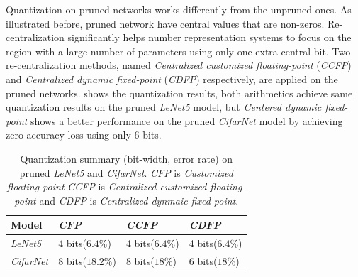 \documentclass[a4paper,12pt]{report}
\begin{document}
Quantization on pruned networks works differently from the unpruned ones.
As illustrated before, pruned network have central values that are non-zeros.
Re-centralization significantly helps number representation systems to focus
on the region with a large number of parameters using only one extra central bit.
Two re-centralization methods, named \textit{Centralized customized floating-point}
(\textit{CCFP}) and \textit{Centralized dynamic fixed-point} (\textit{CDFP}) respectively, are
applied on the pruned networks.
 shows the quantization results, both arithmetics
achieve same quantization results on the pruned \textit{LeNet5} model, but
\textit{Centered dynamic fixed-point} shows a better performance on
the pruned \textit{CifarNet} model by achieving zero accuracy loss using only
$6$ bits.

\begin{table}[!h]
  \centering
  \begin{tabular}{llll}
    \hline
    Model             &\textit{CFP}     &\textit{CCFP}    &\textit{CDFP}\\
    \hline
    \hline
    \textit{LeNet5}   &4 bits($6.4\%$)  &4 bits($6.4\%$)  &4 bits($6.4\%$)\\
    \textit{CifarNet} &8 bits($18.2\%$) &8 bits($18\%$)   &6 bits($18\%$)\\
    \hline
    \hline
  \end{tabular}
  \caption{Quantization summary (bit-width, error rate) on pruned \textit{LeNet5}
  and \textit{CifarNet}. \textit{CFP} is \textit{Customized floating-point}
  \textit{CCFP} is \textit{Centralized customized floating-point} and
  \textit{CDFP} is \textit{Centralized dynmaic fixed-point}.
  }
  \label{tab:quantize_summary2}
\end{table}
%
\end{document}
